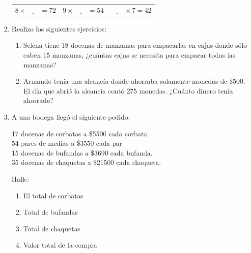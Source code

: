 \documentclass[letterpaper,fleqn]{article}
\begin{document}
\begin{enumerate}
\begin{center}
\begin{tabular}{c|c|c}
$ 8\times\underline{\qquad} = 72 $ & $ 9\times\underline{\qquad}=54 $ & $ \underline{\qquad}\times7=42 $\\
\end{tabular}
\end{center}
  \item Realizo los siguientes ejercicios:
  \begin{enumerate}
    \item Selena tiene 18 docenas de manzanas para empacarlas en cajas donde sólo caben 15 manzanas, ¿cuántas cajas se necesita para empacar todas las manzanas?\noanswer
    \item Armando tenía una alcancía donde ahorraba solamente monedas de \$500. El día que abrió la alcancía contó 275 monedas. ¿Cuánto dinero tenía ahorrado?\noanswer
  \end{enumerate}
  \item A una bodega llegó el siguiente pedido:
  \begin{multicols}{2}
    17 docenas de corbatas a \$5500 cada corbata\\
  54 pares de medias a \$3550 cada par\\
  15 docenas de bufandas a \$3690 cada bufanda.\\
  35 docenas de chaquetas a \$21500 cada chaqueta.
  \end{multicols}
    Halle:\\
  \begin{enumerate}
    \item El total de corbatas \hrulefill
    \item Total de bufandas \hrulefill
    \item Total de chaquetas \hrulefill
    \item Valor total de la compra \hrulefill\\ 
    

\end{enumerate}
\end{enumerate}
\end{document}
